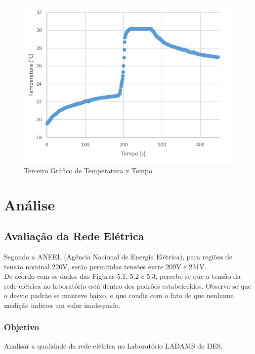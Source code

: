 \documentclass[14pt, oneside]{book}
\newcommand\tab[1][1cm]{\hspace*{#1}}
\theoremstyle{definition}
\begin{document}
                \begin{figure}[H]
                        \centering
                        \includegraphics[scale = 1]{3medida_temperatura_x_tempo_certo.PNG}
                        \caption{Terceiro Gráfico de Temperatura x Tempo}
                        \label{terceiro}
                    \end{figure}
            
                
        \chapter{Análise}
            \section{Avaliação da Rede Elétrica}
                \tab Segundo a ANEEL (Agência Nacional de Energia Elétrica), para regiões de tensão nominal 220V, serão permitidas tensões entre 209V e 231V. \\
                \tab De acordo com os dados das Figuras 5.1, 5.2 e 5.3, percebe-se que a tensão da rede elétrica no laboratório está dentro dos padrões estabelecidos. Observa-se que o desvio padrão se manteve baixo, o que condiz com o fato de que nenhuma medição indicou um valor inadequado. \\
                \subsection{Objetivo}
                    \tab Analisar a qualidade da rede elétrica no Laboratório LADAMS do DES.
\end{document}
